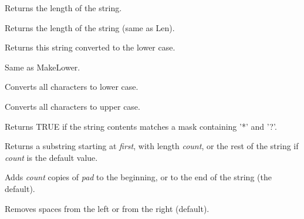 \label{wxstringlen}


Returns the length of the string.

\label{wxstringlength}


Returns the length of the string (same as Len).

\label{wxstringlower}


Returns this string converted to the lower case.

\label{wxstringlowercase}


Same as MakeLower.

\label{wxstringmakelower}


Converts all characters to lower case.

\label{wxstringmakeupper}


Converts all characters to upper case.

\label{wxstringmatches}


Returns TRUE if the string contents matches a mask containing '*' and '?'.

\label{wxstringmid}


Returns a substring starting at {\it first}, with length {\it count}, or the rest of
the string if {\it count} is the default value.

\label{wxstringpad}


Adds {\it count} copies of {\it pad} to the beginning, or to the end of the string (the default).

Removes spaces from the left or from the right (default).

